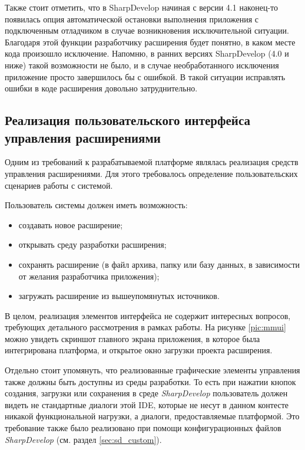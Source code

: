 Также стоит отметить, что в SharpDevelop начиная с версии 4.1 наконец-то появилась опция автоматической остановки выполнения приложения с подключенным отладчиком в случае возникновения исключительной ситуации. Благодаря этой функции разработчику расширения будет понятно, в каком месте кода произошло исключение. Напомню, в ранних версиях SharpDevelop (4.0 и ниже) такой возможности не было, и в случае необработанного исключения приложение просто завершилось бы с ошибкой. В такой ситуации исправлять ошибки в коде расширения довольно затруднительно. 


\subsection{Реализация пользовательского интерфейса управления расширениями}
\label{sec:macro-gui}

Одним из требований к разрабатываемой платформе являлась реализация средств управления расширениями. Для этого требовалось определение пользовательских сценариев работы с системой.

Пользователь системы должен иметь возможность:

\begin{itemize}
  \item создавать новое расширение;
  \item открывать среду разработки расширения;
  \item сохранять расширение (в файл архива, папку или базу данных, в зависимости от желания разработчика приложения);
  \item загружать расширение из вышеупомянутых источников.
\end{itemize}

В целом, реализация элементов интерфейса не содержит интересных вопросов, требующих детального рассмотрения в рамках работы. На рисунке \ref{pic:mmui} можно увидеть скриншот главного экрана приложения, в которое была интегрирована платформа, и открытое окно загрузки проекта расширения.

Отдельно стоит упомянуть, что реализованные графические элементы управления также должны быть доступны из среды разработки. То есть при нажатии кнопок создания, загрузки или сохранения в среде {\it SharpDevelop} пользователь должен видеть не стандартные диалоги этой IDE, которые не несут в данном контесте никакой функциональной нагрузки, а диалоги, предоставляемые платформой. Это требование также было реализовано при помощи конфигурационных файлов {\it SharpDevelop} (см. раздел \ref{sec:sd_custom}).

